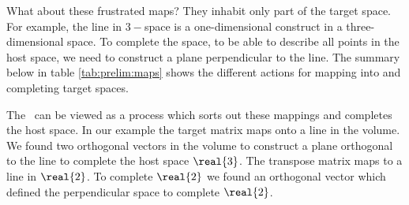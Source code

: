 What about these frustrated maps? They inhabit only part of the target space. For example, the line in $3-$space is a one-dimensional construct in a three-dimensional space. To complete the space, to be able to describe all points in the host space, we need to construct a plane perpendicular to the line. The summary below in table \eqref{tab:prelim:maps} shows the different actions for mapping into and completing target spaces.
\begin{table}[htdp]
\begin{center}
\end{center}
\label{tab:prelim:maps}
\caption[A summary of matrix mapping actions]{A summary of matrix mapping actions. Matrices can be viewed as maps between an input domain and an output codomain. Here are the possible choices for the smallest matrices. Notice that it is not possible to map to a higher dimensional object. If there is a rank deficiency in the row space then the completion space will be nontrivial. The \svdl \ forces resolution of these mappings for a matrix and its transpose.}
\end{table}%


The \svdl \ can be viewed as a process which sorts out these mappings and completes the host space. In our example the target matrix maps onto a line in the volume. We found two orthogonal vectors in the volume to construct a plane orthogonal to the line to complete the host space $\real{3}$. The transpose matrix maps to a line in $\real{2}$. To complete $\real{2}$ we found an orthogonal vector which defined the perpendicular space to complete $\real{2}$. 

\endinput